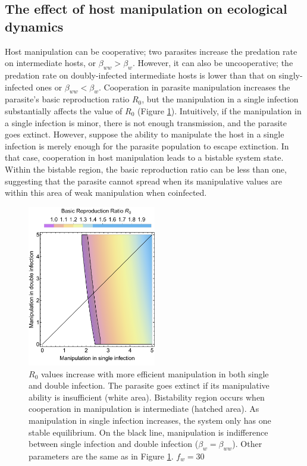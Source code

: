 \documentclass[a4paper]{scrartcl}
\begin{document}
\subsection*{The effect of host manipulation on ecological dynamics}

Host manipulation can be cooperative; two parasites increase the predation rate on intermediate hosts, or $\beta_{ww} > \beta_w$. 
However, it can also be uncooperative; the predation rate on doubly-infected intermediate hosts is lower than that on singly-infected ones or $\beta_{ww} < \beta_w$.
Cooperation in parasite manipulation increases the parasite's basic reproduction ratio $R_0$, but the manipulation in a single infection substantially affects the value of $R_0$ (Figure \ref{fig:manipR0}). 
Intuitively, if the manipulation in a single infection is minor, there is not enough transmission, and the parasite goes extinct.
However, suppose the ability to manipulate the host in a single infection is merely enough for the parasite population to escape extinction. 
In that case, cooperation in host manipulation leads to a bistable system state. 
Within the bistable region, the basic reproduction ratio can be less than one, suggesting that the parasite cannot spread when its manipulative values are within this area of weak manipulation when coinfected. 

\begin{figure}
\centering
\includegraphics[width=0.5\textwidth]{Figures/manip_bifur_R0.pdf}
\caption{$R_0$ values increase with more efficient manipulation in both single and double infection. The parasite goes extinct if its manipulative ability is insufficient (white area). Bistability region occurs when cooperation in manipulation is intermediate (hatched area). As manipulation in single infection increases, the system only has one stable equilibrium. On the black line, manipulation is indifference between single infection and double infection ($\beta_w = \beta_{ww}$). Other parameters are the same as in Figure \ref{fig:manipR0}. $f_w = 30 $}
\label{fig:manipR0}
\end{figure}
\end{document}
